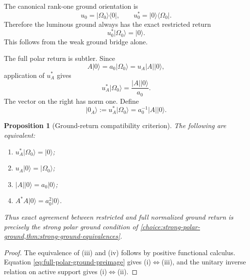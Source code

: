 \documentclass[11pt,reqno]{scrartcl}
\newcommand{\polA}{u_A}
\newcommand{\absA}{|A|}
\newcommand{\uzero}{u_{0}}
\newcommand{\ket}[1]{\lvert #1\rangle}
\newcommand{\bra}[1]{\langle #1\rvert}
\theoremstyle{plain}
\newtheorem{proposition}[proposition]{Proposition}
\theoremstyle{definition}
\theoremstyle{remark}
\begin{document}
The canonical rank-one ground orientation is
\begin{equation}
  \uzero=\ket{\Omega_0}\!\bra0,
  \qquad
  \uzero^*=\ket0\!\bra{\Omega_0}.
  \label{eq:ground-volition-orientation}
\end{equation}
Therefore the luminous ground always has the exact restricted return
\begin{equation}
  \boxed{\uzero^*\ket{\Omega_0}=\ket0.}
  \label{eq:restricted-ground-return}
\end{equation}
This follows from the weak ground bridge alone.

The full polar return is subtler.  Since
\begin{equation}
  A\ket0=a_0\ket{\Omega_0}=\polA\absA\ket0,
\end{equation}
application of $\polA^*$ gives
\begin{equation}
  \boxed{
  \polA^*\ket{\Omega_0}
  =\frac{\absA\ket0}{a_0}.}
  \label{eq:full-polar-ground-preimage}
\end{equation}
The vector on the right has norm one.  Define
\begin{equation}
  \ket{0_A}:=\polA^*\ket{\Omega_0}
  =a_0^{-1}\absA\ket0.
  \label{eq:polar-ground-preimage-def}
\end{equation}

\begin{proposition}[Ground-return compatibility criterion]
\label{prop:ground-return-compatibility}
The following are equivalent:
\begin{enumerate}[label=(\roman*)]
  \item $\polA^*\ket{\Omega_0}=\ket0$;
  \item $\polA\ket0=\ket{\Omega_0}$;
  \item $\absA\ket0=a_0\ket0$;
  \item $A^*A\ket0=a_0^2\ket0$.
\end{enumerate}
Thus exact agreement between restricted and full normalized ground return is
precisely the strong polar ground condition of
\cref{choice:strong-polar-ground,thm:strong-ground-equivalences}.
\end{proposition}

\begin{proof}
The equivalence of (iii) and (iv) follows by positive functional calculus.
Equation \eqref{eq:full-polar-ground-preimage} gives (i)$\Leftrightarrow$(iii),
and the unitary inverse relation on active support gives
(i)$\Leftrightarrow$(ii).
\end{proof}
\end{document}
